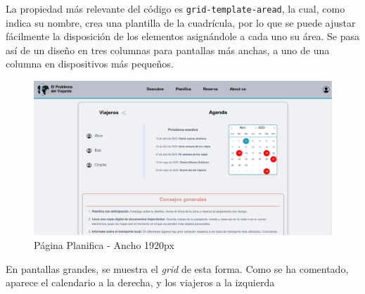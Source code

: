 \documentclass[11pt, a4paper]{book}
\begin{document}
	La propiedad más relevante del código es \texttt{grid-template-aread}, la cual, como indica su nombre, crea una plantilla de la cuadrícula, por lo que se puede ajustar fácilmente la disposición de los elementos asignándole a cada uno su área. Se pasa así de un diseño en tres columnas para pantallas más anchas, a uno de una columna en dispositivos más pequeños.
	
	\begin{figure} [H]
		\centering
		\includegraphics[width=\textwidth]{CSS/2-1 1920.png}
		\caption{Página Planifica - Ancho 1920px}
	\end{figure}

	En pantallas grandes, se muestra el \textit{grid} de esta forma. Como se ha comentado, aparece el calendario a la derecha, y los viajeros a la izquierda
\end{document}

